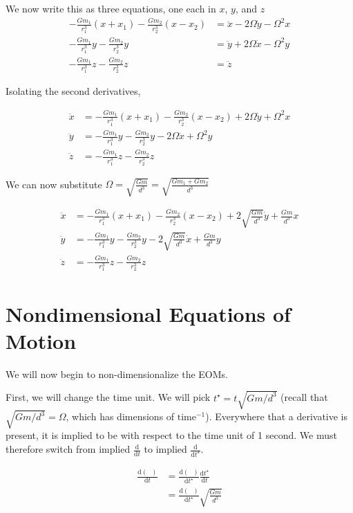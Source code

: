 \documentclass{article}
\newcommand{\dd}[2]{\frac{\mathrm{d}#1}{\mathrm{d}#2}}
\begin{document}
We now write this as three equations, one each in $x$, $y$, and $z$
\[\begin{aligned}
    -\frac{Gm_1}{r_1^3}(x+x_1)-\frac{Gm_2}{r_2^3}(x-x_2)&=\ddot{x}-2\Omega\dot{y}-\Omega^2 x\\
    -\frac{Gm_1}{r_1^3}y-\frac{Gm_2}{r_2^3}y&=\ddot{y}+2\Omega\dot{x}-\Omega^2 y\\
    -\frac{Gm_1}{r_1^3}z-\frac{Gm_2}{r_2^3}z&=\ddot{z}
\end{aligned}\]

Isolating the second derivatives,

\[\begin{aligned}
    \ddot{x}&=-\frac{Gm_1}{r_1^3}(x+x_1)-\frac{Gm_2}{r_2^3}(x-x_2)+2\Omega\dot{y}+\Omega^2 x\\
    \ddot{y}&=-\frac{Gm_1}{r_1^3}y-\frac{Gm_2}{r_2^3}y-2\Omega\dot{x}+\Omega^2 y\\
    \ddot{z}&=-\frac{Gm_1}{r_1^3}z-\frac{Gm_2}{r_2^3}z
\end{aligned}\]
    
We can now substitute $\Omega=\sqrt{\frac{Gm}{d^3}}=\sqrt{\frac{Gm_1+Gm_2}{d^3}}$

\[\boxed{\begin{aligned}
    \ddot{x}&=-\frac{Gm_1}{r_1^3}(x+x_1)-\frac{Gm_2}{r_2^3}(x-x_2)+2\sqrt{\frac{Gm}{d^3}}\dot{y}+\frac{Gm}{d^3}x\\
    \ddot{y}&=-\frac{Gm_1}{r_1^3}y-\frac{Gm_2}{r_2^3}y-2\sqrt{\frac{Gm}{d^3}}\dot{x}+\frac{Gm}{d^3}y\\
    \ddot{z}&=-\frac{Gm_1}{r_1^3}z-\frac{Gm_2}{r_2^3}z
\end{aligned}}\]

\section*{Nondimensional Equations of Motion}
We will now begin to non-dimensionalize the EOMs.

First, we will change the time unit. We will pick $t^\star=t\sqrt{Gm/d^3}$ (recall that $\sqrt{Gm/d^3}=\Omega$, which has dimensions of $\text{time}^{-1}$). Everywhere that a derivative is present, it is implied to be with respect to the time unit of 1 second. We must therefore switch from implied $\dd{}{t}$ to implied $\dd{}{t^\star}$.

\[\begin{aligned}
    \dd{(\phantom{x})}{t}&=\dd{(\phantom{x})}{t^\star}\dd{t^\star}{t}\\
    &=\dd{(\phantom{x})}{t^\star}\sqrt{\frac{Gm}{d^3}}
\end{aligned}\]
\end{document}
